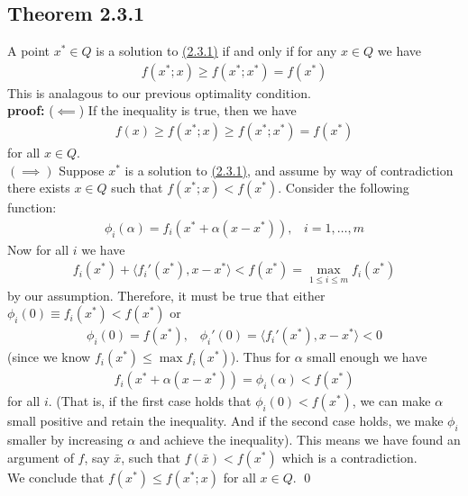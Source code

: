 \documentclass[12pt,a4paper]{article}
\begin{document}
	 \subsection*{Theorem 2.3.1}\label{thm231}
	 A point $x^* \in Q$ is a solution to \hyperref[minimax23]{(2.3.1)} if and only if for any $x \in Q$ we have
	 \begin{align*}
	 	f(x^*;x) \geq f(x^*;x^*) = f(x^*)
	 \end{align*}
	 This is analagous to our previous optimality condition. \\
	 \textbf{proof:} ($\impliedby$) If the inequality is true, then we have
	 \begin{align*}
	 	f(x) \geq f(x^*;x) \geq f(x^*;x^*) = f(x^*)
	 \end{align*}
	 for all $x \in Q$. \\
	 $(\implies)$ Suppose $x^*$ is a solution to \hyperref[minimax23]{(2.3.1)}, and assume by way of contradiction there exists $x \in Q$ such that $f(x^*;x) < f(x^*)$. Consider the following function:
	 \begin{align*}
	 	\phi_i(\alpha) = f_i(x^* + \alpha(x - x^*)), \hspace{10pt} i=1, \ldots, m
	 \end{align*}
	 Now for all $i$ we have
	 \begin{align*}
	 	f_i(x^*) + \langle f_i'(x^*), x - x^* \rangle < f(x^*) = \max_{1 \leq i \leq m} f_i(x^*)
	 \end{align*}
	 by our assumption. Therefore, it must be true that either $\phi_i(0) \equiv f_i(x^*) < f(x^*)$ or 
	 \begin{align*}
	 	\phi_i(0) = f(x^*), \hspace{10pt} \phi_i'(0) = \langle f_i'(x^*), x - x^* \rangle < 0
	 \end{align*}
	 (since we know $f_i(x^*) \leq \max f_i(x^*)$). Thus for $\alpha$ small enough we have
	 \begin{align*}
	 	f_i(x^* + \alpha(x - x^*)) = \phi_i(\alpha) < f(x^*)
	 \end{align*}
	 for all $i$. (That is, if the first case holds that $\phi_i(0) < f(x^*)$, we can make $\alpha$ small positive and retain the inequality. And if the second case holds, we make $\phi_i$ smaller by increasing $\alpha$ and achieve the inequality). This means we have found an argument of $f$, say $\bar{x}$, such that $f(\bar{x}) < f(x^*)$ which is a contradiction. \\
	 We conclude that $f(x^*) \leq f(x^*;x)$ for all $x \in Q$. \qed \\
\end{document}
